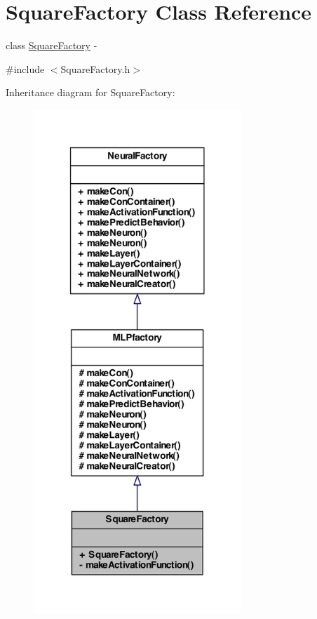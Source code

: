 \hypertarget{class_square_factory}{
\section{SquareFactory Class Reference}
\label{class_square_factory}
}


class \hyperlink{class_square_factory}{SquareFactory} -\/  




{\ttfamily \#include $<$SquareFactory.h$>$}



Inheritance diagram for SquareFactory:\nopagebreak
\begin{figure}[H]
\begin{center}
\leavevmode
\includegraphics[width=222pt]{class_square_factory__inherit__graph}
\end{center}
\end{figure}



